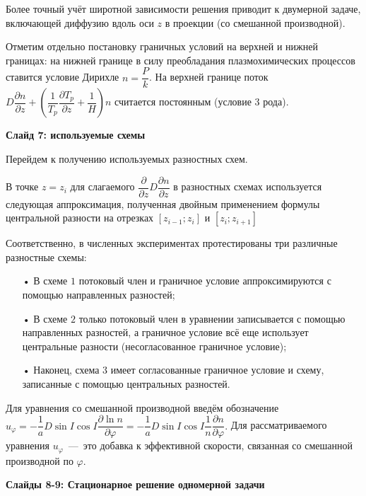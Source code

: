 \documentclass[2pt, a4paper, fleqn]{extarticle}
\begin{document}
Более точный учёт широтной зависимости решения приводит к двумерной задаче, включающей диффузию вдоль оси $z$ в проекции (со смешанной производной).

Отметим отдельно постановку граничных условий на верхней и нижней границах: на нижней границе в силу преобладания плазмохимических процессов ставится условие Дирихле $n = \dfrac{P}{k}$. На верхней границе поток $D\dfrac{\partial n}{\partial z} + \left(\dfrac{1}{T_p}\dfrac{\partial T_p}{\partial z} + \dfrac{1}{H}\right)n$ считается постоянным (условие 3 рода).

\medskip

{\bf Слайд 7: используемые схемы}

Перейдем к получению используемых разностных схем. 


В точке $z=z_i$ для слагаемого $\dfrac{\partial}{\partial z}D\dfrac{\partial n}{\partial z}$ в разностных схемах используется следующая аппроксимация, полученная двойным применением формулы центральной разности на отрезках $[z_{i-1};z_i]$ и $[z_i; z_{i+1}]$

Соответственно, в численных экспериментах протестированы три различные разностные схемы: 
\begin{itemize}
\item[•] В схеме $1$ потоковый член и граничное условие аппроксимируются с помощью направленных разностей; 
\item[•] В схеме $2$ только потоковый член в уравнении записывается с помощью направленных разностей, а граничное условие всё еще использует центральные разности (несогласованное граничное условие);
\item[•] Наконец, схема $3$ имеет согласованные граничное условие и схему, записанные с помощью центральных разностей.
\end{itemize}

\smallskip

Для уравнения со смешанной производной введём обозначение $u_\varphi=-\dfrac{1}{a}D\sin I \cos I\dfrac{\partial \ln n}{\partial \varphi}=-\dfrac{1}{a}D\sin I \cos I\dfrac{1}{n}\dfrac{\partial n}{\partial \varphi}.$ Для рассматриваемого уравнения $u_\varphi$~---~это добавка к эффективной скорости, связанная со смешанной производной по $\varphi$.

\medskip

{\bf Слайды 8-9: Стационарное решение одномерной задачи}
\end{document}
